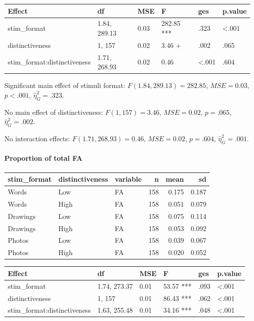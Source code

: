 \documentclass[
  11pt,
]{article}
\begin{document}
\begin{tabular}{l|l|l|l|l|l}
\hline
Effect & df & MSE & F & ges & p.value\\
\hline
stim\_format & 1.84, 289.13 & 0.03 & 282.85 *** & .323 & <.001\\
\hline
distinctiveness & 1, 157 & 0.02 & 3.46 + & .002 & .065\\
\hline
stim\_format:distinctiveness & 1.71, 268.93 & 0.02 & 0.46 & <.001 & .604\\
\hline
\end{tabular}

Significant main effect of stimuli format: \(F(1.84, 289.13) = 282.85\),
\(\mathit{MSE} = 0.03\), \(p < .001\), \(\hat{\eta}^2_G = .323\).

No main effect of distinctiveness: \(F(1, 157) = 3.46\),
\(\mathit{MSE} = 0.02\), \(p = .065\), \(\hat{\eta}^2_G = .002\).

No interaction effects: \(F(1.71, 268.93) = 0.46\),
\(\mathit{MSE} = 0.02\), \(p = .604\), \(\hat{\eta}^2_G = .001\).

\newpage

\hypertarget{proportion-of-total-fa}{%
\paragraph{Proportion of total FA}\label{proportion-of-total-fa}}

\begin{table}[!h]
\centering
\begin{tabular}{lllrrr}
\toprule
stim\_format & distinctiveness & variable & n & mean & sd\\
\midrule
Words & Low & FA & 158 & 0.175 & 0.187\\
Words & High & FA & 158 & 0.051 & 0.079\\
Drawings & Low & FA & 158 & 0.075 & 0.114\\
Drawings & High & FA & 158 & 0.053 & 0.092\\
Photos & Low & FA & 158 & 0.039 & 0.067\\
\addlinespace
Photos & High & FA & 158 & 0.020 & 0.052\\
\bottomrule
\end{tabular}
\end{table}

\begin{tabular}{l|l|l|l|l|l}
\hline
Effect & df & MSE & F & ges & p.value\\
\hline
stim\_format & 1.74, 273.37 & 0.01 & 53.57 *** & .093 & <.001\\
\hline
distinctiveness & 1, 157 & 0.01 & 86.43 *** & .062 & <.001\\
\hline
stim\_format:distinctiveness & 1.63, 255.48 & 0.01 & 34.16 *** & .048 & <.001\\
\hline
\end{tabular}
\end{document}
